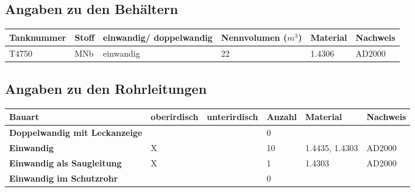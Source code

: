 \documentclass{article}
\begin{document}
\subsection*{Angaben zu den Behältern}

\begin{table}[H]
    \centering
    \begin{tabularx}{\textwidth}{|X|X|X|X|X|X|}
        \hline
        \textbf{Tanknummer} & \textbf{Stoff} & \textbf{einwandig/ \newline doppelwandig} & \textbf{Nennvolumen \newline ($m^3$)} & \textbf{Material} & \textbf{Nachweis} \\
        \hline
        T4750 & MNb & einwandig & 22 & 1.4306 & AD2000 \\
        \hline
    \end{tabularx}
\end{table}



\subsection*{Angaben zu den Rohrleitungen}

\begin{table}[H]
    \centering
    \begin{tabularx}{\textwidth}{|X|X|X|X|X|X|}
        \hline
        \textbf{Bauart} & \textbf{oberirdisch} & \textbf{unterirdisch} & \textbf{Anzahl} & \textbf{Material} & \textbf{Nachweis} \\
        \hline
        \textbf{Doppelwandig \newline mit Leckanzeige} &  &  & 0 &  &  \\
        \hline
        \textbf{Einwandig \newline} & X &  & 10 & 1.4435, 1.4303 & AD2000 \\
        \hline
        \textbf{Einwandig \newline als Saugleitung} & X &   & 1 & 1.4303 & AD2000 \\
        \hline
        \textbf{Einwandig \newline im Schutzrohr} &  &   & 0 &  &  \\
        \hline
    \end{tabularx}
\end{table}
\end{document}

